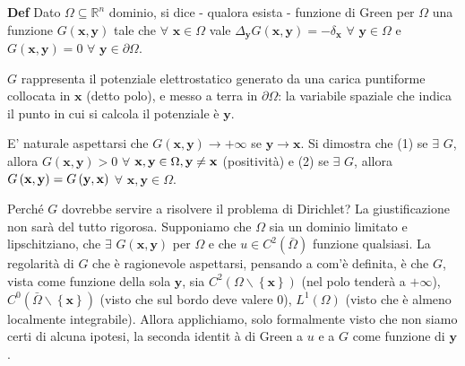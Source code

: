 \documentclass{article}
\begin{document}
\textbf{Def} Dato $\Omega \subseteq 
\mathbb{R}
^{n}$ dominio, si dice - qualora esista - funzione di Green per $\Omega $
una funzione $G\left( \mathbf{x,y}\right) $ tale che $\forall $ $\mathbf{x}%
\in \Omega $ vale $\Delta _{\mathbf{y}}G\left( \mathbf{x,y}\right) =-\delta
_{\mathbf{x}}$ $\forall $ $\mathbf{y}\in \Omega $ e $G\left( \mathbf{x,y}%
\right) =0$ $\forall $ $\mathbf{y}\in \partial \Omega $.

$G$ rappresenta il potenziale elettrostatico generato da una carica
puntiforme collocata in $\mathbf{x}$ (detto polo), e messo a terra in $%
\partial \Omega $: la variabile spaziale che indica il punto in cui si
calcola il potenziale \`{e} $\mathbf{y}$.

E' naturale aspettarsi che $G\left( \mathbf{x,y}\right) \rightarrow +\infty $
se $\mathbf{y\rightarrow x}$. Si dimostra che (1) se $\exists $ $G$, allora $%
G\left( \mathbf{x,y}\right) >0$ $\forall $ $\mathbf{x,y}\in \Omega ,\mathbf{%
y\neq x}$ (positivit\`{a}) e (2) se $\exists $ $G$, allora $G\left( \mathbf{%
x,y}\right) =G\left( \mathbf{y,x}\right) $ $\forall $ $\mathbf{x,y}\in
\Omega $.

Perch\'{e} $G$ dovrebbe servire a risolvere il problema di Dirichlet? La
giustificazione non sar\`{a} del tutto rigorosa. Supponiamo che $\Omega $
sia un dominio limitato e lipschitziano, che $\exists $ $G\left( \mathbf{x,y}%
\right) $ per $\Omega $ e che $u\in C^{2}\left( \bar{\Omega}\right) $
funzione qualsiasi. La regolarit\`{a} di $G$ che \`{e} ragionevole
aspettarsi, pensando a com'\`{e} definita, \`{e} che $G$, vista come
funzione della sola $\mathbf{y}$, sia $C^{2}\left( \Omega \backslash \left\{ 
\mathbf{x}\right\} \right) $ (nel polo tender\`{a} a $+\infty $), $%
C^{0}\left( \bar{\Omega}\backslash \left\{ \mathbf{x}\right\} \right) $
(visto che sul bordo deve valere $0$), $L^{1}\left( \Omega \right) $ (visto
che \`{e} almeno localmente integrabile). Allora applichiamo, solo
formalmente visto che non siamo certi di alcuna ipotesi, la seconda identit%
\`{a} di Green a $u$ e a $G$ come funzione di $\mathbf{y}$.
\end{document}
